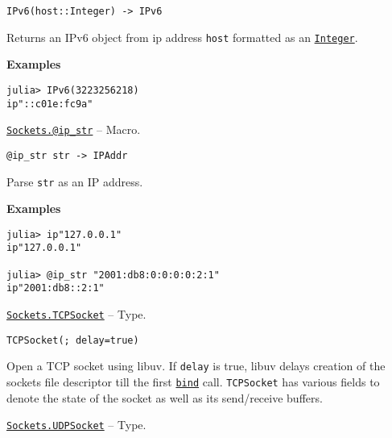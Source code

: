 \begin{adjustwidth}{2em}{0pt}


\begin{verbatim}
IPv6(host::Integer) -> IPv6
\end{verbatim}

Returns an IPv6 object from ip address \texttt{host} formatted as an \hyperlink{8469131683393450448}{\texttt{Integer}}.

\textbf{Examples}


\begin{verbatim}
julia> IPv6(3223256218)
ip"::c01e:fc9a"
\end{verbatim}



\end{adjustwidth}
\hypertarget{5293313767861803133}{} 
\hyperlink{5293313767861803133}{\texttt{Sockets.@ip\_str}}  -- {Macro.}

\begin{adjustwidth}{2em}{0pt}


\begin{verbatim}
@ip_str str -> IPAddr
\end{verbatim}

Parse \texttt{str} as an IP address.

\textbf{Examples}


\begin{verbatim}
julia> ip"127.0.0.1"
ip"127.0.0.1"

julia> @ip_str "2001:db8:0:0:0:0:2:1"
ip"2001:db8::2:1"
\end{verbatim}



\end{adjustwidth}
\hypertarget{5453047654537213204}{} 
\hyperlink{5453047654537213204}{\texttt{Sockets.TCPSocket}}  -- {Type.}

\begin{adjustwidth}{2em}{0pt}


\begin{verbatim}
TCPSocket(; delay=true)
\end{verbatim}

Open a TCP socket using libuv. If \texttt{delay} is true, libuv delays creation of the socket{\textquotesingle}s file descriptor till the first \hyperlink{13811388816704022260}{\texttt{bind}} call. \texttt{TCPSocket} has various fields to denote the state of the socket as well as its send/receive buffers.



\end{adjustwidth}
\hypertarget{5627851531738059255}{} 
\hyperlink{5627851531738059255}{\texttt{Sockets.UDPSocket}}  -- {Type.}

